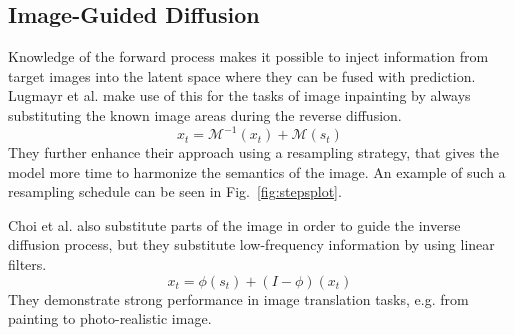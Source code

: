 \subsection{Image-Guided Diffusion}
\label{sec:imageguidance}
Knowledge of the forward process makes it possible to inject information from target images into the latent space where they can be fused with prediction. Lugmayr et al. make use of this for the tasks of image inpainting by always substituting the known image areas during the reverse diffusion.~\autocite{lugmayr2022repaint}
\begin{equation}
    x_{t} = \mathcal{M}^{-1}(x_t) + \mathcal{M}(s_t)
\end{equation}
They further enhance their approach using a resampling strategy, that gives the model more time to harmonize the semantics of the image. An example of such a resampling schedule can be seen in Fig.~\ref{fig:stepsplot}.

Choi et al. also substitute parts of the image in order to guide the inverse diffusion process, but they substitute low-frequency information by using linear filters.~\autocite{choi2021ilvr}
\begin{equation}
    x_{t} = \phi(s_{t}) + (I - \phi) (x_{t})
\end{equation}
They demonstrate strong performance in image translation tasks, e.g. from painting to photo-realistic image.